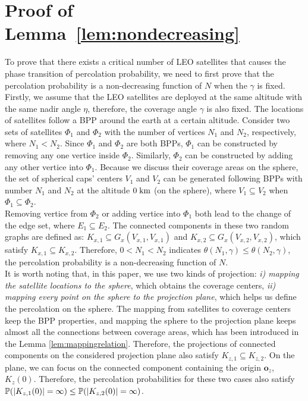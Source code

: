 \documentclass[final]{IEEEtran}
\begin{document}
\section{Proof of Lemma~\ref{lem:nondecreasing}\label{app:nondecreasing}}
To prove that there exists a critical number of LEO satellites that causes the phase transition of percolation probability, we need to first prove that the percolation probability is a non-decreasing function of $N$ when the $\gamma$ is fixed. \\
\indent Firstly, we assume that the LEO satellites are deployed at the same altitude with the same nadir angle $\eta$, therefore, the coverage angle $\gamma$ is also fixed. The locations of satellites follow a BPP around the earth at a certain altitude. Consider two sets of satellites $\Phi_1$ and $\Phi_2$ with the number of vertices $N_1$ and $N_2$, respectively, where $N_1<N_2$. Since $\Phi_1$ and $\Phi_2$ are both BPPs, $\Phi_1$ can be constructed by removing any one vertice inside $\Phi_2$. Similarly, $\Phi_2$ can be constructed by adding any other vertice into $\Phi_1$. Because we discuss their coverage areas on the sphere, the set of spherical caps' centers $V_1$ and $V_2$ can be generated following BPPs with number $N_1$ and $N_2$ at the altitude $0\;\rm km$ (on the sphere), where $V_1\subseteq V_2$ when $\Phi_1\subseteq\Phi_2$.\\
\indent Removing vertice from $\Phi_2$ or adding vertice into $\Phi_1$ both lead to the change of the edge set, where $E_1\subseteq E_2$. The connected components in these two random graphs are defined as: $K_{x,1}\subseteq G_{x}(V_{x,1},V_{x,1})$ and $K_{x,2}\subseteq G_{x}(V_{x,2},V_{x,2})$, which satisfy $K_{x,1}\subseteq K_{x,2}$. Therefore, $0<N_1<N_2$ indicates $\theta(N_1,\gamma)\leq \theta(N_2,\gamma)$, \ie the percolation probability is a non-decreasing function of $N$.\\
\indent It is worth noting that, in this paper, we use two kinds of projection: \textit{i) mapping the satellite locations to the sphere}, which obtains the coverage centers, \textit{ii) mapping every point on the sphere to the projection plane}, which helps us define the percolation on the sphere. The mapping from satellites to coverage centers keep the BPP properties, and mapping the sphere to the projection plane keeps almost all the connections between coverage areas, which has been introduced in the Lemma \ref{lem:mappingrelation}. Therefore, the projections of connected components on the considered projection plane also satisfy $K_{z,1}\subseteq K_{z,2}$. On the plane, we can focus on the connected component containing the origin $\textbf{o}_z$, \ie $K_z(0)$. Therefore, the percolation probabilities for these two cases also satisfy $\P(|K_{z,1}(0)|=\infty)\leq \P(|K_{z,2}(0)|=\infty)$.
\end{document}
